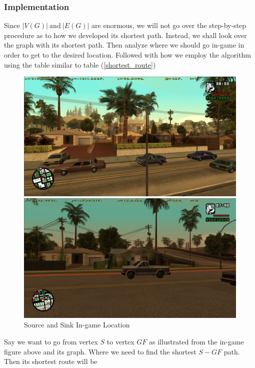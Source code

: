 \documentclass{article}
\begin{document}
	\subsubsection*{Implementation}
	Since \(|V(G)|~\text{and}~|E(G)|\) are enormous, we will not go over the step-by-step procedure as to how we developed its shortest path. Instead, we shall look over the graph with its shortest path. Then analyze where we should go in-game in order to get to the desired location. Followed with how we employ the algorithm using the table similar to table (\ref{shortest_route}) \newpage
	\begin{figure}[!h]
		\centering
		\begin{minipage}{0.49\textwidth}
			\centering
			\includegraphics[width=1\textwidth]{./0img/sourceVertex.png}
		\end{minipage}
		\hfill
		\begin{minipage}{0.49\textwidth}
			\centering
			\includegraphics[width= 1\textwidth]{./0img/sinkVertex.png}
		\end{minipage}
			\hfill
		\begin{minipage}{1.0\textwidth}
			\centering
			
		\end{minipage}
		\caption{Source and Sink In-game Location}
	\end{figure} Say we want to go from vertex \(S\) to vertex \(GF\) as illustrated from the in-game figure above and its graph. Where we need to find the shortest \(S-GF\) path. Then its shortest route will be
\end{document}
